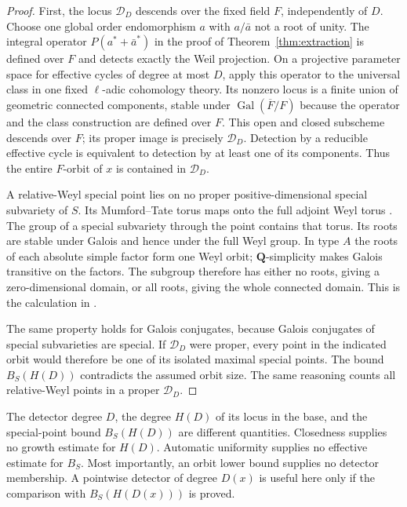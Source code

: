 \documentclass[11pt]{article}
\theoremstyle{definition}
\theoremstyle{remark}
\newcommand{\Q}{\mathbf Q}
\begin{document}
\begin{proof}
First, the locus $\mathcal D_D$ descends over the fixed field $F$, independently of $D$. Choose one global order endomorphism $a$ with $a/\bar a$ not a root of unity. The integral operator $P(a^*+\bar a^*)$ in the proof of Theorem~\ref{thm:extraction} is defined over $F$ and detects exactly the Weil projection. On a projective parameter space for effective cycles of degree at most $D$, apply this operator to the universal class in one fixed $\ell$-adic cohomology theory. Its nonzero locus is a finite union of geometric connected components, stable under $\operatorname{Gal}(\overline F/F)$ because the operator and the class construction are defined over $F$. This open and closed subscheme descends over $F$; its proper image is precisely $\mathcal D_D$. Detection by a reducible effective cycle is equivalent to detection by at least one of its components. Thus the entire $F$-orbit of $x$ is contained in $\mathcal D_D$.

A relative-Weyl special point lies on no proper positive-dimensional special subvariety of $S$. Its Mumford--Tate torus maps onto the full adjoint Weyl torus \cite[Remark~5.8]{ChaiOort}. The group of a special subvariety through the point contains that torus. Its roots are stable under Galois and hence under the full Weyl group. In type $A$ the roots of each absolute simple factor form one Weyl orbit; $\Q$-simplicity makes Galois transitive on the factors. The subgroup therefore has either no roots, giving a zero-dimensional domain, or all roots, giving the whole connected domain. This is the calculation in \cite[Lemma~6.3]{ChaiOort}.

The same property holds for Galois conjugates, because Galois conjugates of special subvarieties are special. If $\mathcal D_D$ were proper, every point in the indicated orbit would therefore be one of its isolated maximal special points. The bound $B_S(H(D))$ contradicts the assumed orbit size. The same reasoning counts all relative-Weyl points in a proper $\mathcal D_D$.
\end{proof}

The detector degree $D$, the degree $H(D)$ of its locus in the base, and the special-point bound $B_S(H(D))$ are different quantities. Closedness supplies no growth estimate for $H(D)$. Automatic uniformity supplies no effective estimate for $B_S$. Most importantly, an orbit lower bound supplies no detector membership. A pointwise detector of degree $D(x)$ is useful here only if the comparison with $B_S(H(D(x)))$ is proved.
\end{document}
